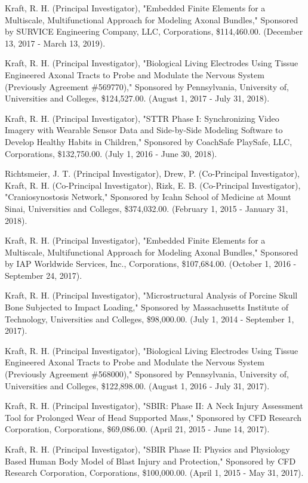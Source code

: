 \documentclass[
]{article}
\begin{document}
Kraft, R. H. (Principal Investigator), "Embedded Finite Elements for a
Multiscale, Multifunctional Approach for Modeling Axonal Bundles,"
Sponsored by SURVICE Engineering Company, LLC, Corporations,
\$114,460.00. (December 13, 2017 - March 13, 2019).

Kraft, R. H. (Principal Investigator), "Biological Living Electrodes
Using Tissue Engineered Axonal Tracts to Probe and Modulate the Nervous
System (Previously Agreement \#569770)," Sponsored by Pennsylvania,
University of, Universities and Colleges, \$124,527.00. (August 1, 2017
- July 31, 2018).

Kraft, R. H. (Principal Investigator), "STTR Phase I: Synchronizing
Video Imagery with Wearable Sensor Data and Side-by-Side Modeling
Software to Develop Healthy Habits in Children," Sponsored by CoachSafe
PlaySafe, LLC, Corporations, \$132,750.00. (July 1, 2016 - June 30,
2018).

Richtsmeier, J. T. (Principal Investigator), Drew, P. (Co-Principal
Investigator), Kraft, R. H. (Co-Principal Investigator), Rizk, E. B.
(Co-Principal Investigator), "Craniosynostosis Network," Sponsored by
Icahn School of Medicine at Mount Sinai, Universities and Colleges,
\$374,032.00. (February 1, 2015 - January 31, 2018).

Kraft, R. H. (Principal Investigator), "Embedded Finite Elements for a
Multiscale, Multifunctional Approach for Modeling Axonal Bundles,"
Sponsored by IAP Worldwide Services, Inc., Corporations, \$107,684.00.
(October 1, 2016 - September 24, 2017).

Kraft, R. H. (Principal Investigator), "Microstructural Analysis of
Porcine Skull Bone Subjected to Impact Loading," Sponsored by
Massachusetts Institute of Technology, Universities and Colleges,
\$98,000.00. (July 1, 2014 - September 1, 2017).

Kraft, R. H. (Principal Investigator), "Biological Living Electrodes
Using Tissue Engineered Axonal Tracts to Probe and Modulate the Nervous
System (Previously Agreement \#568000)," Sponsored by Pennsylvania,
University of, Universities and Colleges, \$122,898.00. (August 1, 2016
- July 31, 2017).

Kraft, R. H. (Principal Investigator), "SBIR: Phase II: A Neck Injury
Assessment Tool for Prolonged Wear of Head Supported Mass," Sponsored by
CFD Research Corporation, Corporations, \$69,086.00. (April 21, 2015 -
June 14, 2017).

Kraft, R. H. (Principal Investigator), "SBIR Phase II: Physics and
Physiology Based Human Body Model of Blast Injury and Protection,"
Sponsored by CFD Research Corporation, Corporations, \$100,000.00.
(April 1, 2015 - May 31, 2017).
\end{document}
